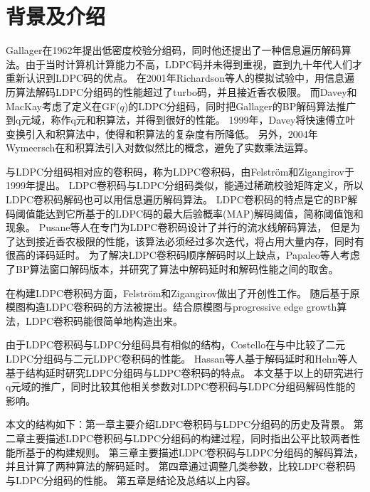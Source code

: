 \chapter{背景及介绍}
Gallager在1962年提出低密度校验分组码\parencite{Gallager1963Low}，同时他还提出了一种信息遍历解码算法。由于当时计算机计算能力不高，LDPC码并未得到重视，直到九十年代人们才重新认识到LDPC码的优点。
在2001年Richardson等人的模拟试验中\parencite{Richardson2001Design}，用信息遍历算法解码LDPC分组码的性能超过了turbo码，并且接近香农极限。
而Davey和MacKay考虑了定义在GF($q$)的LDPC分组码\parencite{Davey1998Low}，同时把Gallager的BP解码算法推广到q元域，称作q元和积算法，并得到很好的性能。
1999年，Davey将快速傅立叶变换引入和积算法中，使得和积算法的复杂度有所降低\parencite{Davey1999Error}。
另外，2004年Wymeersch在和积算法引入对数似然比的概念，避免了实数乘法运算\parencite{Wymeersch2004Log}。

与LDPC分组码相对应的卷积码，称为LDPC卷积码，由Felström和Zigangirov\parencite{Felstrom1999Time}于1999年提出。
LDPC卷积码与LDPC分组码类似，能通过稀疏校验矩阵定义，所以LDPC卷积码解码也可以用信息遍历解码算法。
LDPC卷积码的特点是它的BP解码阈值能达到它所基于的LDPC码的最大后验概率(MAP)解码阈值\parencite{Kudekar2010Threshold}，简称阈值饱和现象。
Pusane等人在\parencite{Pusane2008Implementation}专门为LDPC卷积码设计了并行的流水线解码算法，
但是为了达到接近香农极限的性能，该算法必须经过多次迭代，将占用大量内存，同时有很高的译码延时。
为了解决LDPC卷积码顺序解码时以上缺点，Papaleo等人考虑了BP算法窗口解码版本\parencite{Papaleo2010Windowed}，并研究了算法中解码延时和解码性能之间的取舍。

在构建LDPC卷积码方面，Felström和Zigangirov做出了开创性工作\parencite{Felstrom1999Time}。
随后基于原模图\parencite{Thorpe2003Low}构造LDPC卷积码的方法被提出。结合原模图与progressive edge growth算法\parencite{Hu2005Regular}，LDPC卷积码能很简单地构造出来。

由于LDPC卷积码与LDPC分组码具有相似的结构，Costello在\parencite{Costello2006A}与\parencite{Costello2007A}中比较了二元LDPC分组码与二元LDPC卷积码的性能。
Hassan等人基于解码延时\parencite{Ul2012Comparison}和Hehn等人基于结构延时\parencite{Hehn2009LDPC}研究LDPC分组码与LDPC卷积码的特点。
本文基于以上的研究进行q元域的推广，同时比较其他相关参数对LDPC卷积码与LDPC分组码解码性能的影响。





















本文的结构如下：第一章主要介绍LDPC卷积码与LDPC分组码的历史及背景。
第二章主要描述LDPC卷积码与LDPC分组码的构建过程，同时指出公平比较两者性能所基于的构建规则。
第三章主要描述LDPC卷积码与LDPC分组码的解码算法，并且计算了两种算法的解码延时。
第四章通过调整几类参数，比较LDPC卷积码与LDPC分组码的性能。
第五章是结论及总结以上内容。